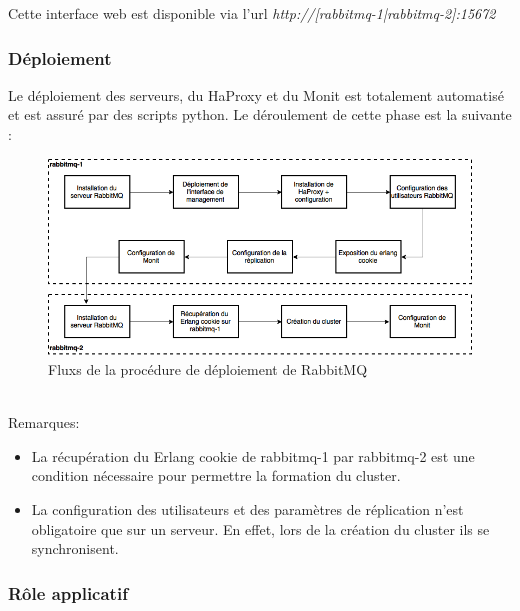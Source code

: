 Cette interface web est disponible via l'url \textit{http://[rabbitmq-1|rabbitmq-2]:15672}

\subsubsection{Déploiement}

Le déploiement des serveurs, du HaProxy et du Monit est totalement automatisé et est assuré par des scripts python. Le déroulement de cette phase est la suivante :
\ \\
\begin{figure}[h]
    \centering
    \includegraphics[scale=0.4]{pics/rabbitmq_deploy.png}
    \caption{Fluxs de la procédure de déploiement de RabbitMQ}
\end{figure}
\ \\
Remarques:
\begin{itemize}
	\item La récupération du Erlang cookie de rabbitmq-1 par rabbitmq-2 est une condition nécessaire pour permettre la formation du cluster.
	\item La configuration des utilisateurs et des paramètres de réplication n'est obligatoire que sur un serveur. En effet, lors de la création du cluster ils se synchronisent.
\end{itemize}

\subsubsection{Rôle applicatif}

